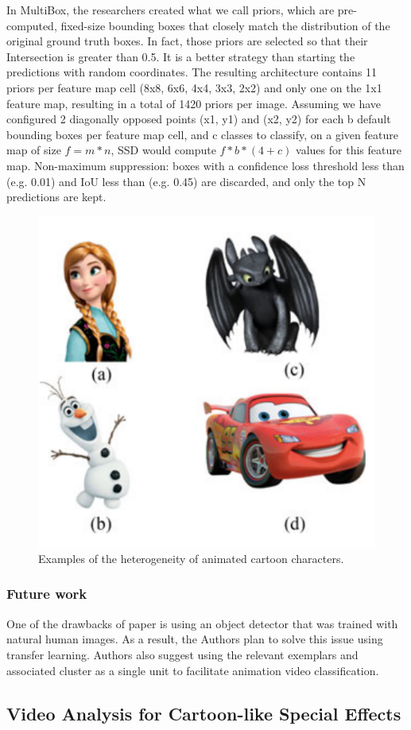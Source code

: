 \documentclass[runningheads]{llncs}
\begin{document}
In MultiBox, the researchers created what we call priors, which are pre-computed, fixed-size bounding boxes that closely match the distribution of the original ground truth boxes. In fact, those priors are selected so that their Intersection is greater than 0.5. It is a better strategy than starting the predictions with random coordinates. The resulting architecture contains 11 priors per feature map cell (8x8, 6x6, 4x4, 3x3, 2x2) and only one on the 1x1 feature map, resulting in a total of 1420 priors per image. Assuming we have configured 2 diagonally opposed points (x1, y1) and (x2, y2) for each b default bounding boxes per feature map cell, and c classes to classify, on a given feature map of size $ f = m * n $, SSD would compute $ f * b * (4 + c) $ values for this feature map. Non-maximum suppression: boxes with a confidence loss threshold less than (e.g. 0.01) and IoU less than (e.g. 0.45) are discarded, and only the top N predictions are kept.\\

\begin{figure}
\centering
\includegraphics[width=.4\textwidth]{figures/cartoon_chars.png}
\caption{Examples of the heterogeneity of animated cartoon characters. } \label{cartoon_chars}
\end{figure}

\subsubsection{Future work}
 One of the drawbacks of paper \cite{somandepalli2018unsupervised} is using an object detector that was trained with natural human images. As a result, the Authors plan to solve this issue using transfer learning. Authors also suggest using the relevant exemplars and associated cluster as a single unit to facilitate animation video classification.\\

\subsection{Video Analysis for Cartoon-like Special Effects}
\end{document}

